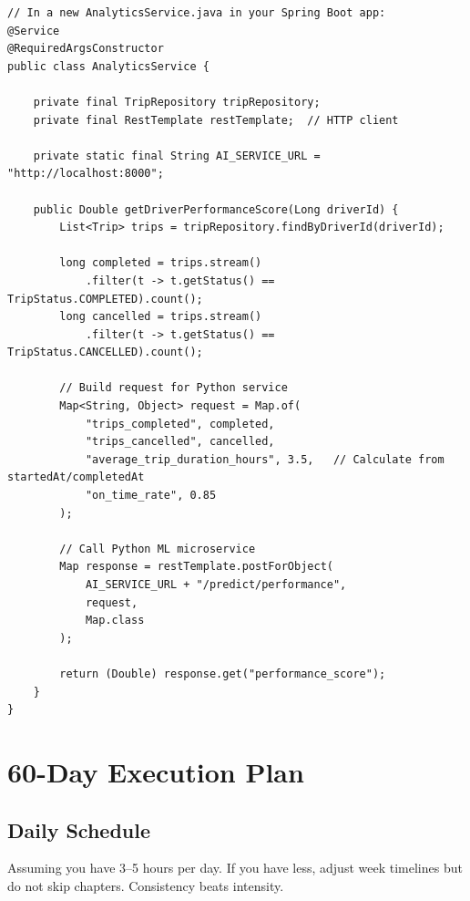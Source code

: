 \documentclass[12pt,a4paper]{report}
\begin{document}
\begin{lstlisting}[caption=Spring Boot calling the Python service]
// In a new AnalyticsService.java in your Spring Boot app:
@Service
@RequiredArgsConstructor
public class AnalyticsService {

    private final TripRepository tripRepository;
    private final RestTemplate restTemplate;  // HTTP client

    private static final String AI_SERVICE_URL = "http://localhost:8000";

    public Double getDriverPerformanceScore(Long driverId) {
        List<Trip> trips = tripRepository.findByDriverId(driverId);

        long completed = trips.stream()
            .filter(t -> t.getStatus() == TripStatus.COMPLETED).count();
        long cancelled = trips.stream()
            .filter(t -> t.getStatus() == TripStatus.CANCELLED).count();

        // Build request for Python service
        Map<String, Object> request = Map.of(
            "trips_completed", completed,
            "trips_cancelled", cancelled,
            "average_trip_duration_hours", 3.5,   // Calculate from startedAt/completedAt
            "on_time_rate", 0.85
        );

        // Call Python ML microservice
        Map response = restTemplate.postForObject(
            AI_SERVICE_URL + "/predict/performance",
            request,
            Map.class
        );

        return (Double) response.get("performance_score");
    }
}
\end{lstlisting}

\chapter{60-Day Execution Plan}

\section{Daily Schedule}

\begin{tcolorbox}[warnbox]
Assuming you have 3--5 hours per day. If you have less, adjust week timelines but do not skip chapters. Consistency beats intensity.
\end{tcolorbox}
\end{document}

